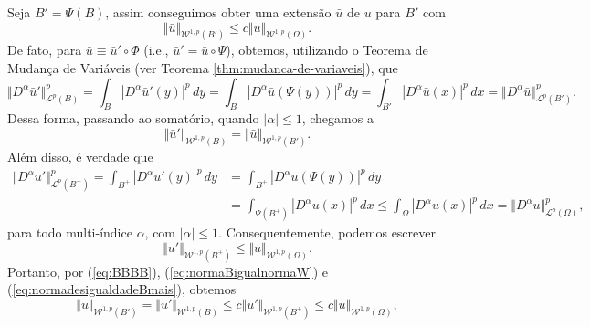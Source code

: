 \documentclass[a4paper, 11pt]{book}
\theoremstyle{definition}
\newcommand{\cL}{\mathcal{L}}
\newcommand{\cW}{\mathcal{W}}
\begin{document}
\begin{prf}
    Seja $B' = \Psi(B)$, assim conseguimos obter uma extensão $\bar u$ de $u$ para $B'$ com
    \[
        \Vert \bar u \Vert_{\cW^{1,p}(B')} \leqslant c \Vert u \Vert_{\cW^{1,p}(\Omega)}.
    \]
    De fato, para $\bar u \equiv \bar u' \circ \Phi$ (i.e., $\bar u' = \bar u \circ \Psi$), obtemos, utilizando o Teorema de Mudança de Variáveis (ver Teorema \ref{thm:mudanca-de-variaveis}), que
    \[
        \Vert D^\alpha \bar u' \Vert_{\cL^p(B)}^p = \int_B |D^\alpha \bar u'(y)|^p \,dy = \int_B |D^\alpha \bar u (\Psi (y))|^p \,dy = \int_{B'} |D^\alpha \bar u (x)|^p \,dx = \Vert D^\alpha \bar u \Vert_{\cL^p(B')}^p.
    \]
    Dessa forma, passando ao somatório, quando $|\alpha| \leqslant 1$, chegamos a
    \begin{equation} \label{eq:normaBigualnormaW}
        \Vert \bar u' \Vert_{\cW^{1,p}(B)} = \Vert  \bar u \Vert_{\cW^{1,p}(B')}.
    \end{equation}
    Além disso, é verdade que
    \[
        \begin{aligned}
            \Vert D^\alpha u' \Vert_{\cL^p(B^+)}^p = \int_{B^+} |D^\alpha u'(y) |^p \,dy &= \int_{B^+} |D^\alpha u (\Psi(y))|^p \,dy\\ &= \int_{\Psi(B^+)} |D^\alpha u(x)|^p \,dx \leqslant \int_{\Omega} |D^\alpha u(x)|^p \,dx = \Vert D^\alpha u \Vert_{\cL^p(\Omega)}^p,
        \end{aligned}
    \]
    para todo multi-índice $\alpha$, com $|\alpha| \leqslant 1$.
    Consequentemente, podemos escrever
    \begin{equation} \label{eq:normadesigualdadeBmais}
        \Vert u' \Vert_{\cW^{1,p}(B^+)} \leqslant \Vert u \Vert_{\cW^{1,p}(\Omega)}.
    \end{equation}
    Portanto, por (\ref{eq:BBBB}), (\ref{eq:normaBigualnormaW}) e (\ref{eq:normadesigualdadeBmais}), obtemos
    \begin{equation} \label{eq:desigualdadeWO}
        \Vert \bar u \Vert_{\cW^{1,p}(B')} = \Vert \bar u' \Vert_{\cW^{1,p}(B)} \leqslant c \Vert u' \Vert_{\cW^{1,p}(B^+)} \leqslant c \Vert u \Vert_{\cW^{1,p}(\Omega)},
    \end{equation}


\end{prf}
\end{document}
